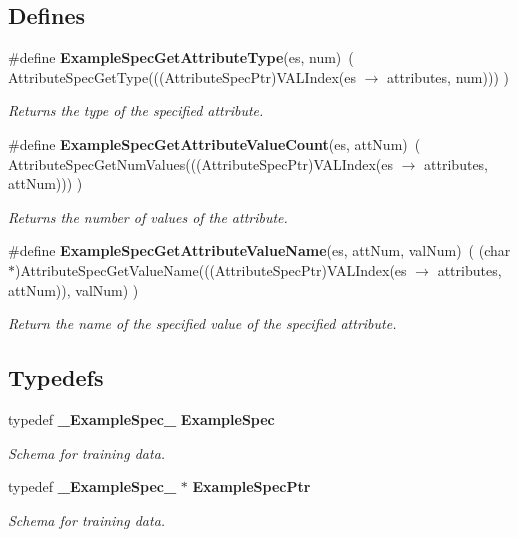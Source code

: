 \subsection*{Defines}
\begin{CompactItemize}
\item 
\#define {\bf Example\-Spec\-Get\-Attribute\-Type}(es, num)\ ( Attribute\-Spec\-Get\-Type(((Attribute\-Spec\-Ptr)VALIndex(es $\rightarrow$ attributes, num))) )
\begin{CompactList}\small\item\em Returns the type of the specified attribute. \item\end{CompactList}\item 
\#define {\bf Example\-Spec\-Get\-Attribute\-Value\-Count}(es, att\-Num)\ ( Attribute\-Spec\-Get\-Num\-Values(((Attribute\-Spec\-Ptr)VALIndex(es $\rightarrow$ attributes, att\-Num))) )
\begin{CompactList}\small\item\em Returns the number of values of the attribute. \item\end{CompactList}\item 
\#define {\bf Example\-Spec\-Get\-Attribute\-Value\-Name}(es, att\-Num, val\-Num)\ ( (char $\ast$)Attribute\-Spec\-Get\-Value\-Name(((Attribute\-Spec\-Ptr)VALIndex(es $\rightarrow$ attributes, att\-Num)), val\-Num) )
\begin{CompactList}\small\item\em Return the name of the specified value of the specified attribute. \item\end{CompactList}\end{CompactItemize}
\subsection*{Typedefs}
\begin{CompactItemize}
\item 
typedef {\bf \_\-Example\-Spec\_\-} {\bf Example\-Spec}
\begin{CompactList}\small\item\em Schema for training data. \item\end{CompactList}\item 
typedef {\bf \_\-Example\-Spec\_\-} $\ast$ {\bf Example\-Spec\-Ptr}
\begin{CompactList}\small\item\em Schema for training data. \item\end{CompactList}\end{CompactItemize}
